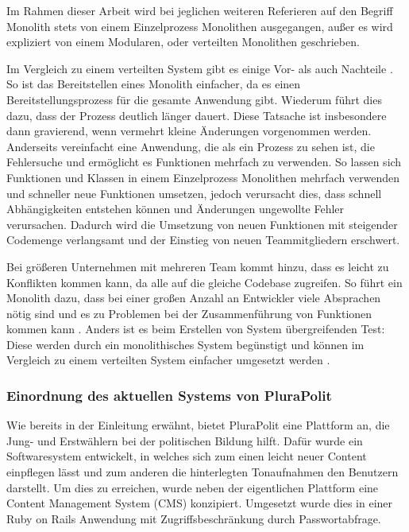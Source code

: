 Im Rahmen dieser Arbeit wird bei jeglichen weiteren Referieren auf den Begriff Monolith stets von einem Einzelprozess Monolithen ausgegangen, außer es wird expliziert von einem Modularen, oder verteilten Monolithen geschrieben.

Im Vergleich zu einem verteilten System gibt es einige Vor- als auch Nachteile \parencite[vgl.][Kap. 2.2.4 und Kap. 2.2.5]{newman_monolith_2019}. So ist das Bereitstellen eines Monolith einfacher, da es einen Bereitstellungsprozess für die gesamte Anwendung gibt. Wiederum führt dies dazu, dass der Prozess deutlich länger dauert. Diese Tatsache ist insbesondere dann gravierend, wenn vermehrt kleine Änderungen vorgenommen werden. Anderseits vereinfacht eine Anwendung, die als ein Prozess zu sehen ist, die Fehlersuche und ermöglicht es Funktionen mehrfach zu verwenden. So lassen sich Funktionen und Klassen in einem Einzelprozess Monolithen mehrfach verwenden und schneller neue Funktionen umsetzen, jedoch verursacht dies, dass schnell Abhängigkeiten entstehen können und Änderungen ungewollte Fehler verursachen. Dadurch wird die Umsetzung von neuen Funktionen mit steigender Codemenge verlangsamt und der Einstieg von neuen Teammitgliedern erschwert.

Bei größeren Unternehmen mit mehreren Team kommt hinzu, dass es leicht zu Konflikten kommen kann, da alle auf die gleiche Codebase zugreifen. So führt ein Monolith dazu, dass bei einer großen Anzahl an Entwickler viele Absprachen nötig sind und es zu Problemen bei der Zusammenführung von Funktionen kommen kann \parencite[vgl.][Kap. 2.2.4]{newman_monolith_2019}. Anders ist es beim Erstellen von System übergreifenden Test: Diese werden durch ein monolithisches System begünstigt und können im Vergleich zu einem verteilten System einfacher umgesetzt werden  \parencite[vgl.][Kap. 2.2.5]{newman_monolith_2019}.

\subsubsection{Einordnung des aktuellen Systems von PluraPolit}

Wie bereits in der Einleitung erwähnt, bietet PluraPolit eine Plattform an, die Jung- und Erstwählern bei der politischen Bildung hilft. Dafür wurde ein Softwaresystem entwickelt, in welches sich zum einen leicht neuer Content einpflegen lässt und zum anderen die hinterlegten Tonaufnahmen den Benutzern darstellt.
Um dies zu erreichen, wurde neben der eigentlichen Plattform eine Content Management System (CMS) konzipiert. Umgesetzt wurde dies in einer Ruby on Rails Anwendung mit Zugriffsbeschränkung durch Passwortabfrage.

